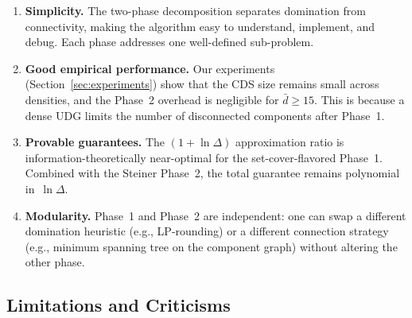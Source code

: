 \documentclass[11pt,a4paper]{article}
\begin{document}
\begin{enumerate}[nosep]
  \item \textbf{Simplicity.} The two-phase decomposition separates
        domination from connectivity, making the algorithm easy to understand,
        implement, and debug.  Each phase addresses one well-defined sub-problem.
  \item \textbf{Good empirical performance.} Our experiments
        (Section~\ref{sec:experiments}) show that the CDS size remains small
        across densities, and the Phase~2 overhead is negligible for
        $\bar{d} \geq 15$.  This is because a dense UDG limits the number of
        disconnected components after Phase~1.
  \item \textbf{Provable guarantees.} The $(1 + \ln \Delta)$
        approximation ratio is information-theoretically near-optimal for
        the set-cover-flavored Phase~1.  Combined with the Steiner Phase~2,
        the total guarantee remains polynomial in~$\ln \Delta$.
  \item \textbf{Modularity.} Phase~1 and Phase~2 are independent: one can
        swap a different domination heuristic (e.g., LP-rounding) or a
        different connection strategy (e.g., minimum spanning tree on the
        component graph) without altering the other phase.
\end{enumerate}

\subsection{Limitations and Criticisms}
\end{document}
